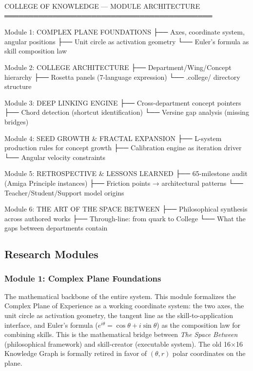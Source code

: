 \documentclass[11pt,letterpaper]{article}
\begin{document}
\begin{asciibox}
  COLLEGE OF KNOWLEDGE — MODULE ARCHITECTURE
  ═══════════════════════════════════════════

  Module 1: COMPLEX PLANE FOUNDATIONS
  ├── Axes, coordinate system, angular positions
  ├── Unit circle as activation geometry
  └── Euler's formula as skill composition law

  Module 2: COLLEGE ARCHITECTURE
  ├── Department/Wing/Concept hierarchy
  ├── Rosetta panels (7-language expression)
  └── .college/ directory structure

  Module 3: DEEP LINKING ENGINE
  ├── Cross-department concept pointers
  ├── Chord detection (shortcut identification)
  └── Versine gap analysis (missing bridges)

  Module 4: SEED GROWTH & FRACTAL EXPANSION
  ├── L-system production rules for concept growth
  ├── Calibration engine as iteration driver
  └── Angular velocity constraints

  Module 5: RETROSPECTIVE & LESSONS LEARNED
  ├── 65-milestone audit (Amiga Principle instances)
  ├── Friction points → architectural patterns
  └── Teacher/Student/Support model origins

  Module 6: THE ART OF THE SPACE BETWEEN
  ├── Philosophical synthesis across authored works
  ├── Through-line: from quark to College
  └── What the gaps between departments contain
\end{asciibox}

\subsection{Research Modules}

\subsubsection{Module 1: Complex Plane Foundations}

The mathematical backbone of the entire system. This module formalizes the Complex Plane of
Experience as a working coordinate system: the two axes, the unit circle as activation geometry,
the tangent line as the skill-to-application interface, and Euler's formula ($e^{i\theta} = \cos\theta
+ i\sin\theta$) as the composition law for combining skills. This is the mathematical bridge
between \textit{The Space Between} (philosophical framework) and skill-creator (executable
system). The old 16$\times$16 Knowledge Graph is formally retired in favor of $(θ, r)$ polar
coordinates on the plane.
\end{document}
